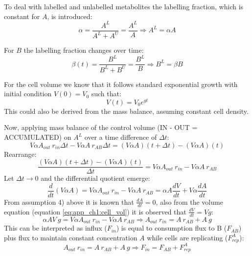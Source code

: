 To deal with labelled and unlabelled metabolites the labelling fraction, which is constant for $A$, is introduced:
\begin{equation}
    \alpha = \frac{A^L}{A^L +A^U} = \frac{A^L}{A} \Longrightarrow A^L = \alpha A
\label{eq:app_ch1:alpha}
\end{equation}

For $B$ the labelling fraction changes over time:
\begin{equation}
    \beta(t) = \frac{B^L}{B^L +B^U} = \frac{B^L}{B} \Longrightarrow B^L = \beta B
\label{eq:app_ch1:beta}
\end{equation}

For the cell volume we know that it follows standard exponential growth with initial condition $V(0) = V_0$ such that:
\begin{equation}
    V(t) = V_0 e^{g t}
\label{eq:app_ch1:cell_vol}
\end{equation}
This could also be derived from the mass balance, assuming constant cell density.

Now, applying mass balance of the control volume (IN - OUT = ACCUMULATED) on $A^L$ over a time difference of $\Delta t$:
\begin{equation}
    V \alpha A_{out}\ r_{in} \Delta t - V \alpha A\ r_{AB} \Delta t = (V \alpha A)(t + \Delta t) - (V \alpha A)(t)
\label{eq:app_ch1:A_balance}
\end{equation}
Rearrange:
\begin{equation}
    \frac{(V \alpha A)(t + \Delta t) - (V \alpha A)(t)}{\Delta t} = V \alpha A_{out}\ r_{in} - V \alpha A\ r_{AB}
\label{eq:app_ch1:A_dq1}
\end{equation}
Let $\Delta t \rightarrow 0$ and the differential quotient emerge:
\begin{equation}
    \frac{d}{dt} (V \alpha A) = V \alpha A_{out}\ r_{in} - V \alpha A\ r_{AB} = \alpha A \frac{d V}{dt} + V \alpha \frac{dA}{dt}
\label{eq:app_ch1:A_dq2}
\end{equation}
From assumption 4) above it is known that $\frac{dA}{dt} = 0$, also from the volume equation (equation \ref{eq:app_ch1:cell_vol}) it is observed that $\frac{dV}{dt} = V g$:
\begin{equation}
    \alpha A V\ g = V \alpha A_{out}\ r_{in} - V \alpha A\ r_{AB} \Longrightarrow A_{out}\ r_{in} = A\ r_{AB} + A\ g
\label{eq:app_ch1:A_dq2s}
\end{equation}
This can be interpreted as influx ($F_{in}$) is equal to consumption flux to B ($F_{AB}$) plus flux to maintain constant concentration $A$ while cells are replicating ($F^A_{rep}$):
\begin{equation}
    A_{out}\ r_{in} = A\ r_{AB} + A\ g \Longrightarrow F_{in} = F_{AB} + F^A_{rep}
\label{eq:app_ch1:A_flux}
\end{equation}


